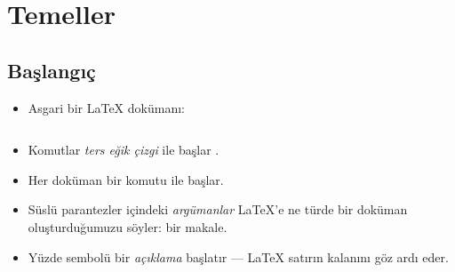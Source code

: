 \documentclass[aspectratio=169]{beamer}
\begin{document}
\section{Temeller}

\subsection{Başlangıç}
\begin{frame}[fragile]{\insertsubsection}
\begin{itemize}
\item Asgari bir \LaTeX{} dokümanı:
\inputminted[frame=single]{latex}{basics.tex}
\item Komutlar \emph{ters eğik çizgi} ile başlar \keystrokebftt{\bs}.
\item Her doküman bir  komutu ile başlar.
\item Süslü parantezler \keystrokebftt{\{} \keystrokebftt{\}} içindeki \emph{argümanlar}  \LaTeX{}'e ne türde bir doküman oluşturduğumuzu söyler: bir makale.
\item Yüzde sembolü \keystrokebftt{\%} bir \emph{açıklama} başlatır --- \LaTeX{}
satırın kalanını göz ardı eder.
\end{itemize}
\end{frame}
\end{document}
